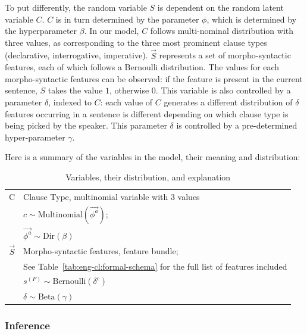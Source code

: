 To put differently, the random variable $S$ is dependent on the random latent variable $C$. $C$ is in turn determined by the parameter $\phi$, which is determined by the hyperparameter $\beta$. In our model, $C$ follows multi-nominal distribution with three values, as corresponding to the three most prominent clause types (declarative, interrogative, imperative). $\vec{S}$ represents a set of morpho-syntactic features, each of which follows a Bernoulli distribution. The values for each morpho-syntactic features can be observed: if the feature is present in the current sentence, $S$ takes the value $1$, otherwise $0$. This variable is also controlled by a parameter $\delta$, indexed to $C$: each value of $C$ generates a different distribution of $\delta$ features occurring in a sentence is different depending on which clause type is being picked by the speaker. This parameter $\delta$ is controlled by a pre-determined hyper-parameter $\gamma$.


Here is a summary of the variables in the model, their meaning and distribution:

\begin{table}[H]
    \centering
    \begin{tabular}{c|l}
    \hline
    \hline
        C &  Clause Type, multinomial variable with 3 values\\
        & $ c \sim  \mbox{Multinomial}(\vec{\phi^{a}})$;\\
        &$\vec{\phi^{a}} \sim \mbox{Dir}(\beta)$\\
\hline
        $\vec{S}$ &  Morpho-syntactic features, feature bundle; \\
        & See Table~\ref{tab:eng-cl:formal-schema} for the full list of features included \\
        & $s^{(F)} \sim \mbox{Bernoulli}(\delta^{c})$ \\
        &$\delta\sim \mbox{Beta}(\gamma)$\\
    \hline
    \hline
    \end{tabular}
    \caption{Variables, their distribution, and explanation}
    \label{tab:baseline-variables}
\end{table}





\subsubsection{Inference}
\label{sec:engcl:model:baseline:infer}


